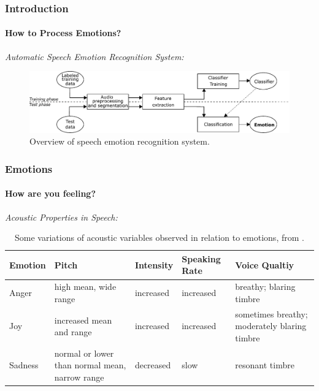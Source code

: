 \documentclass[10pt,usepdftitle=false,aspectratio=169]{beamer}
\begin{document}




\begin{frame}\frametitle{Introduction}
    \framesubtitle{How to Process Emotions?}
    


\vspace{2em}

\vspace{1em}
	\emph{Automatic Speech Emotion Recognition System:}
	\begin{figure}
	\includegraphics[width=\textwidth]{figures/EmotionRecognitionSystem.pdf}
	\caption{Overview of speech emotion recognition system.}
\end{figure}


	

\end{frame}



\begin{frame}\frametitle{Emotions}
    \framesubtitle{How are you feeling?}
    


\vspace{2em}

\vspace{1em}
	\emph{Acoustic Properties in Speech:}

	\small
	\begin{table}
		\renewcommand{\arraystretch}{1.1}
		\centering
		\caption[]{Some variations of acoustic variables observed in relation to emotions, from \cite{vogt2008automatic}.}
		
		\begin{tabularx}{\textwidth}{YYYYY}
			\toprule
			\textbf{Emotion}&  \textbf{Pitch} &  \textbf{Intensity} &  \textbf{Speaking Rate}&\textbf{Voice Qualtiy}  \\
			\midrule
			Anger & high mean, wide range& increased& increased &breathy; blaring timbre \\
			Joy & increased mean and range & increased &increased &sometimes breathy; moderately blaring timbre\\
			Sadness & normal or lower than normal mean, narrow range & decreased & slow& resonant timbre  \\
			\bottomrule
		\end{tabularx}
	\end{table}
	
	

\end{frame}
\end{document}
